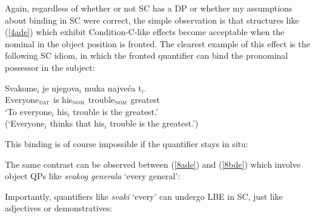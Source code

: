\documentclass[output=paper]{langscibook}
\begin{document}
Again, regardless of whether or not SC has a DP or whether my assumptions about binding in SC were correct, the simple observation is that structures like (\ref{4ade}) which exhibit Condition-C-like effects become acceptable when the nominal in the object position is fronted. The clearest example of this effect is the following SC idiom, in which the fronted quantifier can bind the pronominal possessor in the subject:

\begin{exe}
\ex \label{6de}
\gll Svakome$_{i}$  je njegova$_{i}$ muka najveća  t$_{i}$.\\
Everyone$_{\textsc{dat}}$ is his$_{\textsc{nom}}$ trouble$_{\textsc{nom}}$ greatest\\
\glt ‘To everyone$_{i}$ his$_{i}$ trouble is the greatest.’ \\
(‘Everyone$_{i}$ thinks that his$_{i}$ trouble is the greatest.’)
\end{exe}

This binding is of course impossible if the quantifier stays in situ:

\begin{exe}
\end{exe}

The same contrast can be observed between (\ref{8ade}) and (\ref{8bde}) which involve object QPs like \textit{svakog generala} ‘every general’:

\begin{exe}
\ex \label{8de}
\begin{xlist}

\end{xlist}
\end{exe}

Importantly, quantifiers like \textit{svaki} ‘every’ can undergo LBE in SC, just like adjectives or demonstratives:
\end{document}
